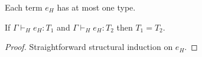 Each term $e_{H}$ has at most one type.
\begin{huot}
\label{huot}
If $\Gamma\vdash_{H}e_{H}:T_{1}$ and $\Gamma\vdash_{H}e_{H}:T_{2}$ then $T_{1}=T_{2}$.
\begin{proof}
Straightforward structural induction on $e_{H}$.
\end{proof}
\end{huot}